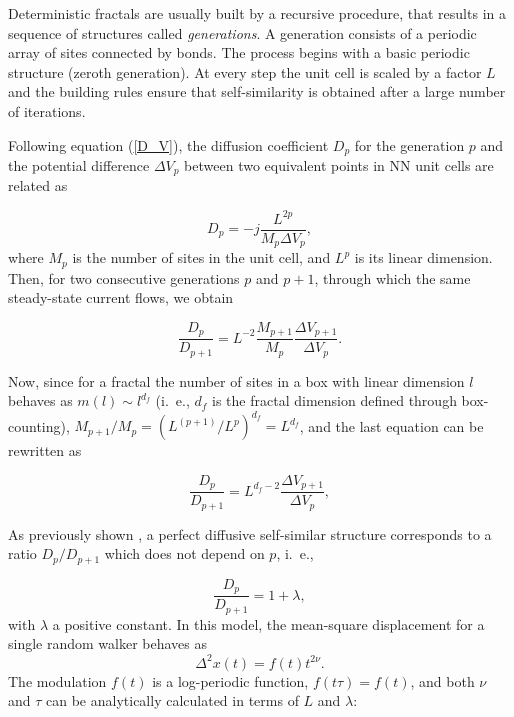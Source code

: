 \documentclass[12pt]{iopart}
\begin{document}
Deterministic fractals are usually built by a recursive procedure, that
results in a sequence of structures called {\it generations}. 
A generation consists of a periodic array of sites connected by bonds. 
The process begins with a basic periodic structure (zeroth generation). At every step
the unit cell is scaled by a factor $L$ and the building rules ensure that
 self-similarity is obtained after a large number of iterations.


Following equation (\ref{D_V}), the diffusion coefficient $D_{p}$ for the
generation $p$ and the potential difference $\Delta V_{p}$ between two equivalent points in
 NN unit cells  are related as

\begin{equation}
    D_{p} = -j \frac{L^{2p}}{M_{p}\Delta V_{p}},
    \label{D_V_p}
\end{equation}
where $M_{p}$ is the number of sites in the unit cell, and  $L^{p}$ is its  linear
dimension. Then, for two consecutive generations $p$ and $p+1$, through which the same steady-state current flows,  we obtain

\begin{equation}
    \frac{D_{p}}{D_{p+1}}=  L^{-2}\frac{M_{p+1}}{M_{p}}
    \frac{\Delta V_{p+1}}{\Delta V_{p}}.
    \label{D_cociente_1}
\end{equation}

Now, since for a fractal the number of sites in a box with linear dimension 
$l$ behaves as $m(l)\sim l^{d_f}$ (i.~e., $d_f$ is the fractal dimension 
defined through box-counting), $M_{p+1}/M_{p}=(L^{(p+1)}/L^{p})^{d_f}=L^{d_f}$, 
and the last equation  can be rewritten as 

\begin{equation}
    \frac{D_{p}}{D_{p+1}}=  L^{d_f-2}
    \frac{\Delta V_{p+1}}{\Delta V_{p}},
    \label{D_cociente_2}
\end{equation}

As previously shown \cite{Padilla2009,Padilla2010}, a
perfect diffusive self-similar structure corresponds to a ratio
$D_{p}/D_{p+1}$ which does not depend on $p$, i.~e.,    

\begin{equation}
\frac{D_p}{D_{p+1}}=1+\lambda,
  \label{lambda}
\end{equation}
with $\lambda$ a positive constant. In this model, 
the mean-square displacement 
for a single random walker behaves as 
\begin{equation}
\Delta^2 x(t)=f(t) t^{2\nu}.
    \label{msd}
\end{equation}
The modulation $f(t)$ is a log-periodic function, $f(t \tau)=
f(t)$, and both $\nu$ and $\tau$ can be  analytically
calculated in terms of $L$ and $\lambda$:
\end{document}
